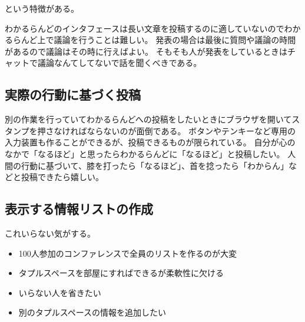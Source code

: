 という特徴がある。

わかるらんどのインタフェースは長い文章を投稿するのに適していないのでわかるらんど上で議論を行うことは難しい。
発表の場合は最後に質問や議論の時間があるので議論はその時に行えばよい。
そもそも人が発表をしているときはチャットで議論なんてしてないで話を聞くべきである。

\subsection{実際の行動に基づく投稿}

別の作業を行っていてわかるらんどへの投稿をしたいときにブラウザを開いてスタンプを押さなければならないのが面倒である。
ボタンやテンキーなど専用の入力装置も作ることができるが、投稿できるものが限られている。
自分が心のなかで「なるほど」と思ったらわかるらんどに「なるほど」と投稿したい。
人間の行動に基づいて、膝を打ったら「なるほど」、首を捻ったら「わからん」などと投稿できたら嬉しい。

\subsection{表示する情報リストの作成}

これいらない気がする。

\begin{itemize}
\item 100人参加のコンファレンスで全員のリストを作るのが大変
\item タプルスペースを部屋にすればできるが柔軟性に欠ける
\item いらない人を省きたい
\item 別のタプルスペースの情報を追加したい
\end{itemize}